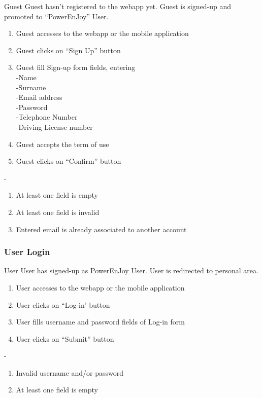 	
				{Guest}
				{}
				{Guest hasn't registered to the webapp yet.}
				{Guest is signed-up and promoted to ``PowerEnJoy'' User.}
				{
					\begin{enumerate}
						\item Guest accesses to the webapp or the mobile application
						\item Guest clicks on ``Sign Up'' button
						\item Guest fill Sign-up form fields, entering\\
						-Name\\
						-Surname\\
						-Email address\\
						-Password\\
						-Telephone Number\\
						-Driving License number
						\item Guest accepts the term of use
						\item Guest clicks on ``Confirm'' button\end{enumerate}
				}
				{-}
				{
				\begin{enumerate}
					\item At least one field is empty
					\item At least one field is invalid
					\item Entered email is already associated to another account\end{enumerate}
				}
\pagebreak


\subsubsection{User Login}\label{login}

{User}
{}
{User has signed-up as PowerEnJoy User.}
{User is redirected to personal area.}
{
	\begin{enumerate}
		\item User accesses to the webapp or the mobile application
		\item User clicks on ``Log-in' button
		\item User fills username and password fields of Log-in form
		\item User clicks on ``Submit'' button
	\end{enumerate}
}
{-}
{
	\begin{enumerate}
		\item Invalid username and/or password
		\item At least one field is empty
	\end{enumerate}
}

